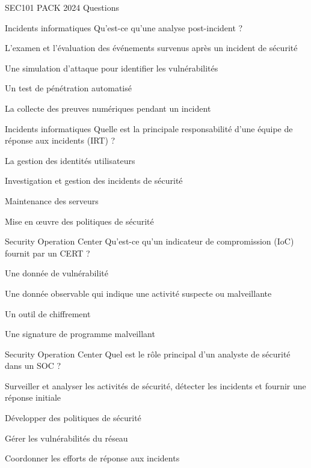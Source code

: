 \documentclass[12pt]{article}
\begin{document}
\begin{quiz}{SEC101 PACK 2024 Questions}
\begin{multi}[points=1]{Incidents informatiques}
Qu'est-ce qu'une analyse post-incident ?
    \item *L'examen et l'évaluation des événements survenus après un incident de sécurité
    \item Une simulation d'attaque pour identifier les vulnérabilités
    \item Un test de pénétration automatisé
    \item La collecte des preuves numériques pendant un incident
\end{multi}

\begin{multi}[points=1]{Incidents informatiques}
Quelle est la principale responsabilité d'une équipe de réponse aux incidents (IRT) ?
    \item La gestion des identités utilisateurs
    \item *Investigation et gestion des incidents de sécurité
    \item Maintenance des serveurs
    \item Mise en œuvre des politiques de sécurité
\end{multi}

\begin{multi}[points=1]{Security Operation Center}
Qu'est-ce qu'un indicateur de compromission (IoC) fournit par un CERT ?
    \item Une donnée de vulnérabilité
    \item *Une donnée observable qui indique une activité suspecte ou malveillante
    \item Un outil de chiffrement
    \item* Une signature de programme malveillant
\end{multi}

\begin{multi}[points=1]{Security Operation Center}
Quel est le rôle principal d'un analyste de sécurité dans un SOC ?
    \item *Surveiller et analyser les activités de sécurité, détecter les incidents et fournir une réponse initiale
    \item Développer des politiques de sécurité
    \item Gérer les vulnérabilités du réseau
    \item Coordonner les efforts de réponse aux incidents
\end{multi}


\end{quiz}
\end{document}
